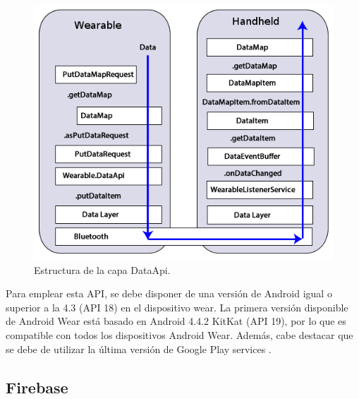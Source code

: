 \begin{figure}[H]
	\centering
	\includegraphics[scale=0.5]{imagenes/dataApi.png}
	\caption{Estructura de la capa DataApi.}
	\label{DataApi}
\end{figure}
\noindent
Para emplear esta API, se debe disponer de una versión de Android igual o superior a la 4.3 (API 18) en el dispositivo wear. La primera versión disponible de Android Wear está basado en Android 4.4.2 KitKat (API 19), por lo que es compatible con todos los dispositivos Android Wear. Además, cabe destacar que se debe de utilizar la última versión de Google Play services \cite{playServices}.


\subsection{Firebase}

